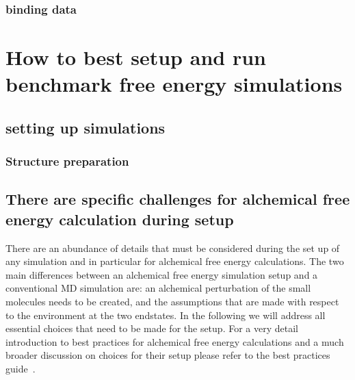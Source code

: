 \documentclass[9pt,bestpractices]{livecoms}
\begin{document}
\subsubsection{binding data}


\section{How to best setup and run benchmark free energy simulations}
\subsection{setting up simulations}
\label{sec:setup}

\subsubsection{Structure preparation}
\label{sec:prep}

\subsection{There are specific challenges for alchemical free energy calculation during setup}
\label{sec:alchemical_prep}
There are an abundance of details that must be considered during the set up of any simulation and in particular for alchemical free energy calculations. The two main differences between an alchemical free energy simulation setup and a conventional MD simulation are: an alchemical perturbation of the small molecules needs to be created, and the assumptions that are made with respect to the environment at the two endstates. In the following we will address all essential choices that need to be made for the setup. For a very detail introduction to best practices for alchemical free energy calculations and a much broader discussion on choices for their setup please refer to the best practices guide~\cite{mey2020best}. 
\end{document}
